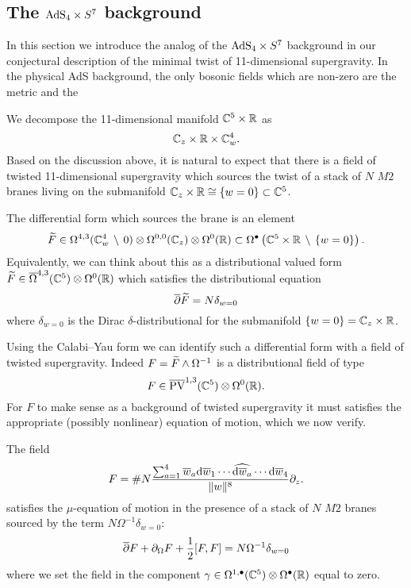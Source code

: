 \subsection{The ${\rm AdS}_4 \times S^7$ background}

In this section we introduce the analog of the ${\rm AdS}_4 \times S^7$ background in our conjectural description of the minimal twist of 11-dimensional supergravity. 
In the physical AdS background, the only bosonic fields which are non-zero are the metric and the 

\parsec[]

We decompose the 11-dimensional manifold $\mathbb C^5 \times \mathbb R$ as
\[
\mathbb C_z \times \mathbb R \times \mathbb C^4_w .
\]
Based on the discussion above, it is natural to expect that there is a field of twisted 11-dimensional supergravity which sources the twist of a stack of $N$ $M2$ branes living on the submanifold $\mathbb C_z \times \mathbb R \cong \{w=0\} \subset \mathbb C^5$. 

The differential form which sources the brane is an element
\[
\widetilde{F} \in \Omega^{4,3} (\mathbb C^4_w \, \setminus \, 0) \otimes \Omega^{0,0} (\mathbb C_z) \otimes \Omega^{0} (\mathbb R) \subset \Omega^{\bullet} \left(\mathbb C^5 \times \mathbb R \, \setminus \, \{w=0\}\right) .
\]
Equivalently, we can think about this as a distributional valued form $\widetilde{F} \in \overline{\Omega}^{4,3}(\mathbb C^5) \otimes \Omega^0 (\mathbb R)$ which satisfies the distributional equation
\[
\overline{\partial} \widetilde{F} = N \delta_{w=0} 
\]
where $\delta_{w=0}$ is the Dirac $\delta$-distributional for the submanifold $\{w=0\} = \mathbb C_z \times \mathbb R$. 

Using the Calabi--Yau form we can identify such a differential form with a field of twisted supergravity. 
Indeed $F = \widetilde{F} \wedge \Omega^{-1}$ is a distributional field of type
\[
F \in \overline{{\rm PV}}^{1,3}(\mathbb C^5) \otimes \Omega^0 (\mathbb R) .
\]
For $F$ to make sense as a background of twisted supergravity it must satisfies the appropriate (possibly nonlinear) equation of motion, which we now verify. 

\begin{lem}
The field 
\[
F = \# N \frac{\sum_{a=1}^4 \overline{w}_a {\rm d} \overline{w}_1 \cdots \widehat{{\rm d} \overline{w}_a} \cdots {\rm d} \overline{w}_4}{\|w\|^{8}} \partial_z .
\]
satisfies the $\mu$-equation of motion in the presence of a stack of $N$ $M2$ branes sourced by the term $N \Omega^{-1} \delta_{w=0}$:
\[
\overline{\partial} F + \partial_{\Omega} F + \frac12 [F, F] = N \Omega^{-1} \delta_{w=0} 
\]
where we set the field in the component $\gamma \in \Omega^{1,\bullet}(\mathbb C^5) \otimes \Omega^\bullet(\mathbb R)$ equal to zero. 
\end{lem}

